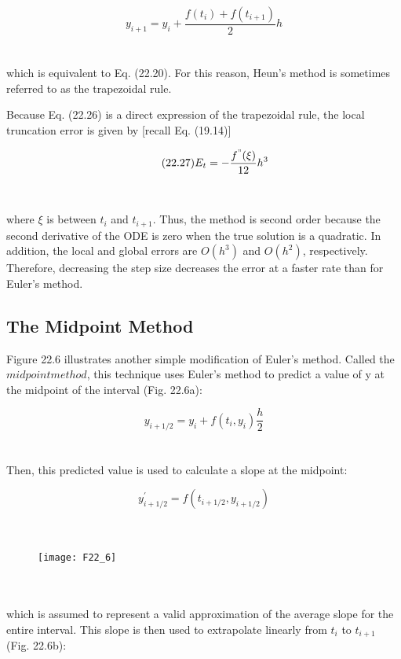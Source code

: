 \documentclass[../main.tex]{subfiles}
\begin{document}
\begin{equation}
\tag{22.26}
y_{i+1} = y_{i} + \dfrac{f(t_{i}) + f(t_{i+1}) }{2}h
\end{equation}\\
\\
which is equivalent to Eq. (22.20). For this reason, Heun's method is sometimes referred to
as the trapezoidal rule.

Because Eq. (22.26) is a direct expression of the trapezoidal rule, the local truncation
error is given by [recall Eq. (19.14)]

\begin{equation}
\tag{22.27}
E_{t} = - \dfrac{f^{"}(\xi)}{12} h^3
\end{equation}\\
\\
where $\xi$ is between $t_{i}$ and $t_{i+1}$. Thus, the method is second order because the second derivative of the ODE is zero when the true solution is a quadratic. In addition, the local and
global errors are $O(h^3)$ and $O(h^2)$, respectively. Therefore, decreasing the step size
decreases the error at a faster rate than for Euler's method.

\subsection{The Midpoint Method}

Figure 22.6 illustrates another simple modification of Euler's method. Called the $midpoint method$, this technique uses Euler's method to predict a value of y at the midpoint of the
interval (Fig. 22.6a):

\begin{equation}
\tag{22.28}
y_{i+1/2} = y_{i} + f(t_{i},y_{i})\dfrac{h}{2}
\end{equation}\\
\\
Then, this predicted value is used to calculate a slope at the midpoint:

\begin{equation}
\tag{22.29}
y^{'}_{i+1/2} = f( t_{i+1/2}, y_{i+1/2} )
\end{equation}\\
\\
\begin{figure}[hbt!]
	\texttt{[image: F22\_6]}
	\label{F22.6}
\end{figure}\\
\\
which is assumed to represent a valid approximation of the average slope for the entire
interval. This slope is then used to extrapolate linearly from $t_{i}$ to $t_{i+1}$ (Fig. 22.6b):
\end{document}
